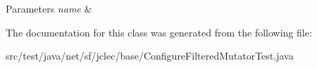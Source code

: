 \begin{DoxyParams}{Parameters}
{\em name} & \\
\hline
\end{DoxyParams}


The documentation for this class was generated from the following file\-:\begin{DoxyCompactItemize}
\item 
src/test/java/net/sf/jclec/base/Configure\-Filtered\-Mutator\-Test.\-java\end{DoxyCompactItemize}
